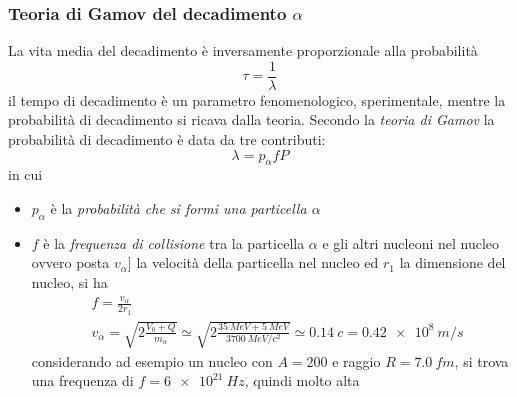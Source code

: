 \subsubsection{Teoria di Gamov del decadimento $\alpha$}
La vita media del decadimento è inversamente proporzionale alla probabilità
\begin{equation}
\tau = \frac{1}{\lambda}
\end{equation}
il tempo di decadimento è un parametro fenomenologico, sperimentale, mentre la probabilità di decadimento si ricava dalla teoria.
Secondo la \emph{teoria di Gamov} la probabilità di decadimento è data da tre contributi:
\begin{equation}
\lambda = p_{\alpha} f P
\end{equation}
in cui
\begin{itemize}
\item $p_{\alpha}$ è la \emph{probabilità che si formi una particella $\alpha$}

\item $f$ è la \emph{frequenza di collisione} tra la particella $\alpha$ e gli altri nucleoni nel nucleo ovvero posta $v_{\alpha}]$ la velocità della particella nel nucleo ed $r_1$ la dimensione del nucleo, si ha 
\begin{equation}
\begin{split}
& f = \frac{v_{\alpha}}{2 r_1} \\
& v_{\alpha} = \sqrt{ 2\frac{V_0 + Q}{m_{\alpha}} } \simeq \sqrt{ 2\frac{\SI{35}{MeV} + \SI{5}{MeV}}{\SI{3700}{MeV/c^2}} } \simeq \SI{0.14}{c} = \SI{0.42e8}{m/s}
\end{split}
\end{equation}
considerando ad esempio un nucleo con $A=200$ e raggio $R = \SI{7.0}{fm}$, si trova una frequenza di $f = \SI{6e21}{Hz}$, quindi molto alta


\end{itemize}
